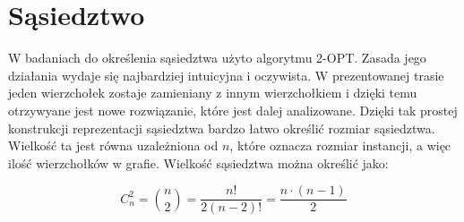 \section{Sąsiedztwo}

W badaniach do określenia sąsiedztwa użyto algorytmu
2-OPT. Zasada jego działania wydaje się najbardziej intuicyjna i oczywista.
W prezentowanej trasie jeden wierzchołek zostaje zamieniany
z innym wierzchołkiem i dzięki temu otrzywyane jest nowe rozwiązanie, które
jest dalej analizowane. Dzięki tak prostej konstrukcji reprezentacji
sąsiedztwa bardzo łatwo określić rozmiar sąsiedztwa. Wielkość ta jest
równa uzależniona od $n$, które oznacza rozmiar instancji, a więc ilość
wierzchołków w grafie. Wielkość sąsiedztwa można określić jako:

$$ C_{n}^{2} = {n\choose 2} = \frac{n!}{2(n-2)!} = \frac{n \cdot (n-1)}{2}$$